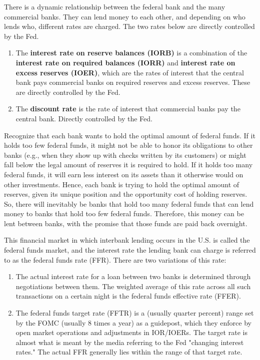 \documentclass{article}
\begin{document}
    \begin{definition}
      There is a dynamic relationship between the federal bank and the many commercial banks. They can lend money to each other, and depending on who lends who, different rates are charged. The two rates below are directly controlled by the Fed.
      \begin{enumerate}
        \item The \textbf{interest rate on reserve balances (IORB)} is a combination of the \textbf{interest rate on required balances (IORR)} and \textbf{interest rate on excess reserves (IOER)}, which are the rates of interest that the central bank pays commercial banks on required reserves and excess reserves. These are directly controlled by the Fed.
        \item The \textbf{discount rate} is the rate of interest that commercial banks pay the central bank. Directly controlled by the Fed.
      \end{enumerate}
    \end{definition}

    Recognize that each bank wants to hold the optimal amount of federal funds. If it holds too few federal funds, it might not be able to honor its obligations to other banks (e.g., when they show up with checks written by its customers) or might fall below the legal amount of reserves it is required to hold. If it holds too many federal funds, it will earn less interest on its assets than it otherwise would on other investments. Hence, each bank is trying to hold the optimal amount of reserves, given its unique position and the opportunity cost of holding reserves. So, there will inevitably be banks that hold too many federal funds that can lend money to banks that hold too few federal funds. Therefore, this money can be lent between banks, with the promise that those funds are paid back overnight.

    \begin{definition}
      This financial market in which interbank lending occurs in the U.S. is called the federal funds market, and the interest rate the lending bank can charge is referred to as the federal funds rate (FFR). There are two variations of this rate:
      \begin{enumerate}
        \item The actual interest rate for a loan between two banks is determined through negotiations between them. The weighted average of this rate across all such transactions on a certain night is the federal funds effective rate (FFER).
        \item The federal funds target rate (FFTR) is a (usually quarter percent) range set by the FOMC (usually 8 times a year) as a guidepost, which they enforce by open market operations and adjustments in IOR/IOERs. The target rate is almost what is meant by the media referring to the Fed "changing interest rates." The actual FFR generally lies within the range of that target rate.
      \end{enumerate}
    \end{definition}
\end{document}
